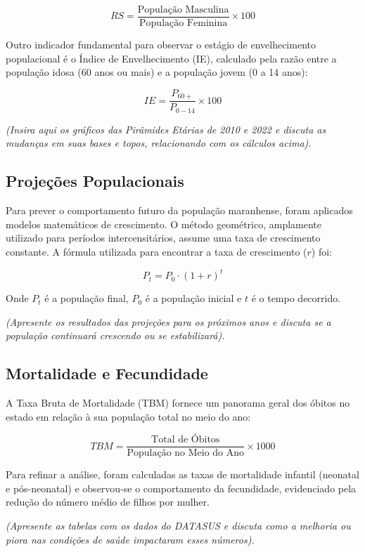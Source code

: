 \documentclass[
  brazilian,
  12pt,
]{article}
\begin{document}
\[RS = \frac{\text{População Masculina}}{\text{População Feminina}} \times 100\]

Outro indicador fundamental para observar o estágio de envelhecimento
populacional é o Índice de Envelhecimento (IE), calculado pela razão
entre a população idosa (60 anos ou mais) e a população jovem (0 a 14
anos):

\[IE = \frac{P_{60+}}{P_{0-14}} \times 100\]

\emph{(Insira aqui os gráficos das Pirâmides Etárias de 2010 e 2022 e
discuta as mudanças em suas bases e topos, relacionando com os cálculos
acima).}

\subsection{Projeções
Populacionais}\label{projeuxe7uxf5es-populacionais}

Para prever o comportamento futuro da população maranhense, foram
aplicados modelos matemáticos de crescimento. O método geométrico,
amplamente utilizado para períodos intercensitários, assume uma taxa de
crescimento constante. A fórmula utilizada para encontrar a taxa de
crescimento (\(r\)) foi:

\[P_t = P_0 \cdot (1 + r)^t\]

Onde \(P_t\) é a população final, \(P_0\) é a população inicial e \(t\)
é o tempo decorrido.

\emph{(Apresente os resultados das projeções para os próximos anos e
discuta se a população continuará crescendo ou se estabilizará).}

\subsection{Mortalidade e Fecundidade}\label{mortalidade-e-fecundidade}

A Taxa Bruta de Mortalidade (TBM) fornece um panorama geral dos óbitos
no estado em relação à sua população total no meio do ano:

\[TBM = \frac{\text{Total de Óbitos}}{\text{População no Meio do Ano}} \times 1000\]

Para refinar a análise, foram calculadas as taxas de mortalidade
infantil (neonatal e pós-neonatal) e observou-se o comportamento da
fecundidade, evidenciado pela redução do número médio de filhos por
mulher.

\emph{(Apresente as tabelas com os dados do DATASUS e discuta como a
melhoria ou piora nas condições de saúde impactaram esses números).}
\end{document}
